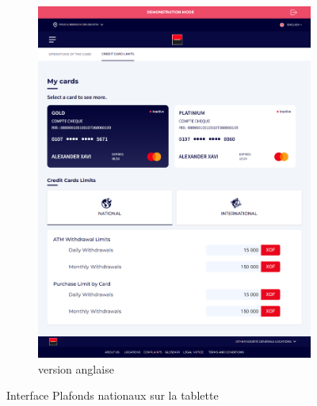 \begin{figure}[!ht]
\begin{subfigure}[b]{0.49\textwidth}
        \includegraphics[width=\textwidth]{images/screens/limitsnat/tablette.png}
        \caption{version anglaise}
    \end{subfigure}
       \caption{Interface Plafonds nationaux sur la tablette}
\end{figure}

\newpage

